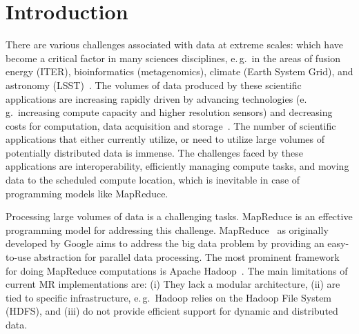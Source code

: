 \documentclass{acm_proc_article-sp}
\begin{document}


\section{Introduction}

There are various challenges associated with data at extreme scales: which
have become a critical factor in many sciences disciplines, e.\,g.\ in the
areas of fusion energy (ITER), bioinformatics (metagenomics), climate (Earth
System Grid), and astronomy
(LSST)~\cite{Berriman:2011:AAS:2039359.2047483,Jha:2011fk}. The volumes of
data produced by these scientific applications are increasing rapidly driven
by advancing technologies (e.\,g.\ increasing compute capacity and higher
resolution sensors) and decreasing costs for computation, data acquisition and
storage~\cite{hey2009}. The number of scientific applications that either
currently utilize, or need to utilize large volumes of potentially distributed
data is immense. The challenges faced by these applications are
interoperability, efficiently managing compute tasks, and moving data to the
scheduled compute location, which is inevitable in case of programming models
like MapReduce.

Processing large volumes of data is a challenging tasks. MapReduce is an
effective programming model for addressing this challenge.
MapReduce~\cite{Dean:2004:MSD:1251254.1251264} as originally developed by
Google aims to address the big data problem by providing an easy-to-use
abstraction for parallel data processing. The most prominent framework for 
doing MapReduce computations is Apache Hadoop~\cite{hadoop}. The main 
limitations of current MR implementations are: (i) They lack a modular 
architecture, (ii) are tied to specific infrastructure, e.\,g.\ Hadoop relies 
on the Hadoop File System (HDFS), and  (iii) do not provide efficient support 
for dynamic and distributed data.

\end{document}
